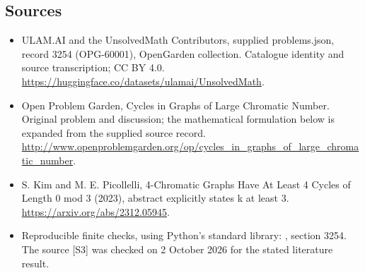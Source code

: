 \documentclass[11pt,a4paper]{article}
\begin{document}
\subsection{Sources}
\begin{itemize}
\item[S1] ULAM.AI and the UnsolvedMath Contributors, supplied problems.json, record 3254 (OPG-60001), OpenGarden collection. Catalogue identity and source transcription; CC BY 4.0.
\url{https://huggingface.co/datasets/ulamai/UnsolvedMath}.
\item[S2] Open Problem Garden, Cycles in Graphs of Large Chromatic Number. Original problem and discussion; the mathematical formulation below is expanded from the supplied source record.
\url{http://www.openproblemgarden.org/op/cycles_in_graphs_of_large_chromatic_number}.
\item[S3] S. Kim and M. E. Picollelli, 4-Chromatic Graphs Have At Least 4 Cycles of Length 0 mod 3 (2023), abstract explicitly states k at least 3.
\url{https://arxiv.org/abs/2312.05945}.

\item[R1] Reproducible finite checks, using Python's standard library:
, section 3254.
The source [S3] was checked on 2 October 2026 for the stated literature result.

\end{itemize}
\end{document}
